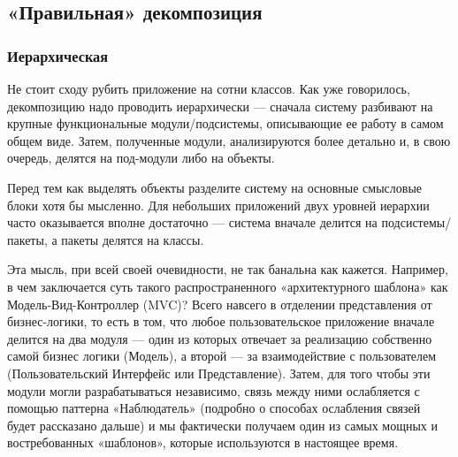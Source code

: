 \documentclass[a4paper]{article}
\begin{document}
\subsection{«Правильная» декомпозиция}

\subsubsection{Иерархическая}

Не стоит сходу рубить приложение на сотни классов. Как уже говорилось, декомпозицию надо проводить иерархически — сначала систему разбивают на крупные функциональные модули/подсистемы, описывающие ее работу в самом общем виде. Затем, полученные модули, анализируются более детально и, в свою очередь, делятся на под-модули либо на объекты.

Перед тем как выделять объекты разделите систему на основные смысловые блоки хотя бы мысленно. Для небольших приложений двух уровней иерархии часто оказывается вполне достаточно — система вначале делится на подсистемы/пакеты, а пакеты делятся на классы.

\begin{figure}[h]
\end{figure}

Эта мысль, при всей своей очевидности, не так банальна как кажется. Например, в чем заключается суть такого распространенного «архитектурного шаблона» как Модель-Вид-Контроллер (MVC)? Всего навсего в отделении представления от бизнес-логики, то есть в том, что любое пользовательское приложение вначале делится на два модуля — один из которых отвечает за реализацию собственно самой бизнес логики (Модель), а второй — за взаимодействие с пользователем (Пользовательский Интерфейс или Представление). Затем, для того чтобы эти модули могли разрабатываться независимо, связь между ними ослабляется с помощью паттерна «Наблюдатель» (подробно о способах ослабления связей будет рассказано дальше) и мы фактически получаем один из самых мощных и востребованных «шаблонов», которые используются в настоящее время.
\end{document}
